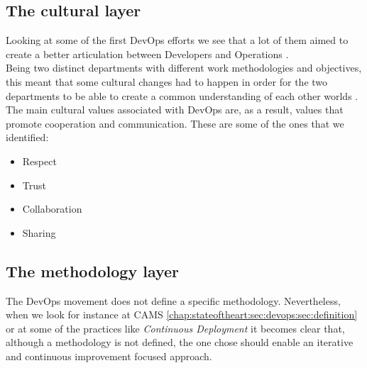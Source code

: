      \subsection{The cultural layer} \label{chap:stateoftheart:sec:devops:sec:culture}
      Looking at some of the first DevOps efforts we see that a lot of them aimed to create a better articulation between Developers and Operations \cite{Debois2008,Allspaw}.\\
      Being two distinct departments with different work methodologies and objectives, this meant that some cultural changes had to happen in order for the two departments to be able to create a common understanding of each other worlds \cite{Allspaw}.\\
      The main cultural values associated with DevOps are, as a result, values that promote cooperation and communication. These are some of the ones that we identified:
      \begin{itemize}
          \item Respect \cite{Davis2015,Allspaw}
          \item Trust \cite{Huttermann2012}
          \item Collaboration \cite{Davis2015}
          \item Sharing \cite{Willis2010}
      \end{itemize}

      \subsection{The methodology layer} \label{chap:stateoftheart:sec:devops:sec:methodology}
      The DevOps movement does not define a specific methodology. Nevertheless, when we look for instance at CAMS \ref{chap:stateoftheart:sec:devops:sec:definition} or at some of the practices like \textit{Continuous Deployment} it becomes clear that, although a methodology is not defined, the one chose should enable an iterative and continuous improvement focused approach.

